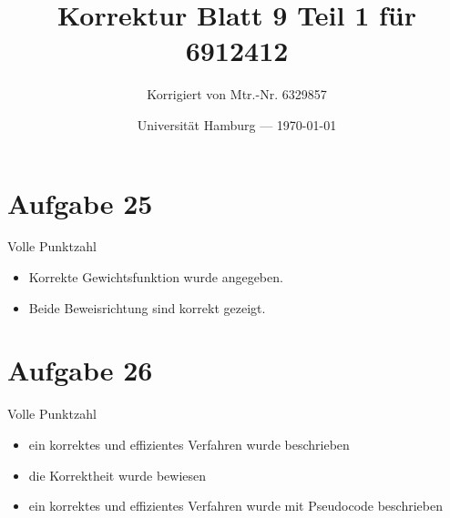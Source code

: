 \documentclass[parskip=half,a4paper]{scrartcl}
\title{Korrektur Blatt 9 Teil 1 für 6912412}
\author{Korrigiert von Mtr.-Nr. 6329857}
\date{Universität Hamburg --- \today}
\begin{document}
\maketitle %

\section{Aufgabe 25}

Volle Punktzahl

\begin{itemize}
    \item Korrekte Gewichtsfunktion wurde angegeben.
    \item Beide Beweisrichtung sind korrekt gezeigt.
\end{itemize}

\section{Aufgabe 26}

Volle Punktzahl

\begin{itemize}
    \item ein korrektes und effizientes Verfahren wurde beschrieben
    \item die Korrektheit wurde bewiesen
    \item ein korrektes und effizientes Verfahren wurde mit Pseudocode beschrieben
\end{itemize}
\end{document}
